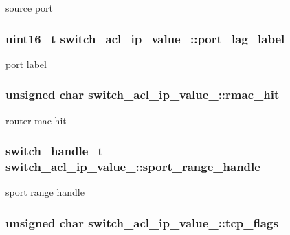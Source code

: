 source port \hypertarget{unionswitch__acl__ip__value___ad6771696d2681953785bea84120136f5}{
\subsubsection[{port\+\_\+lag\+\_\+label}]{\setlength{\rightskip}{0pt plus 5cm}uint16\+\_\+t switch\+\_\+acl\+\_\+ip\+\_\+value\+\_\+\+::port\+\_\+lag\+\_\+label}}\label{unionswitch__acl__ip__value___ad6771696d2681953785bea84120136f5}
port label \hypertarget{unionswitch__acl__ip__value___ae494fb4f2b504ed074d458ab8b4fc538}{
\subsubsection[{rmac\+\_\+hit}]{\setlength{\rightskip}{0pt plus 5cm}unsigned char switch\+\_\+acl\+\_\+ip\+\_\+value\+\_\+\+::rmac\+\_\+hit}}\label{unionswitch__acl__ip__value___ae494fb4f2b504ed074d458ab8b4fc538}
router mac hit \hypertarget{unionswitch__acl__ip__value___aa1ebf3b5531ac34096302414c28b12eb}{
\subsubsection[{sport\+\_\+range\+\_\+handle}]{\setlength{\rightskip}{0pt plus 5cm}switch\+\_\+handle\+\_\+t switch\+\_\+acl\+\_\+ip\+\_\+value\+\_\+\+::sport\+\_\+range\+\_\+handle}}\label{unionswitch__acl__ip__value___aa1ebf3b5531ac34096302414c28b12eb}
sport range handle \hypertarget{unionswitch__acl__ip__value___ab9e787b75fb06987f57a88abbf76f466}{
\subsubsection[{tcp\+\_\+flags}]{\setlength{\rightskip}{0pt plus 5cm}unsigned char switch\+\_\+acl\+\_\+ip\+\_\+value\+\_\+\+::tcp\+\_\+flags}}\label{unionswitch__acl__ip__value___ab9e787b75fb06987f57a88abbf76f466}
